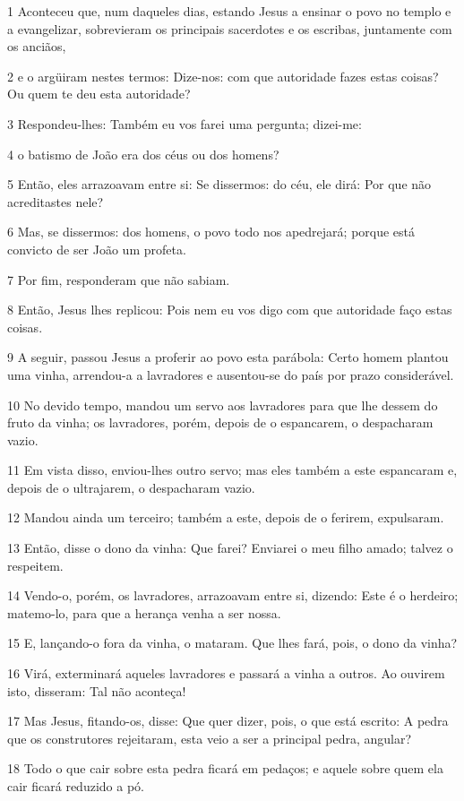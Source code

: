 \par 1 Aconteceu que, num daqueles dias, estando Jesus a ensinar o povo no templo e a evangelizar, sobrevieram os principais sacerdotes e os escribas, juntamente com os anciãos,
\par 2 e o argüiram nestes termos: Dize-nos: com que autoridade fazes estas coisas? Ou quem te deu esta autoridade?
\par 3 Respondeu-lhes: Também eu vos farei uma pergunta; dizei-me:
\par 4 o batismo de João era dos céus ou dos homens?
\par 5 Então, eles arrazoavam entre si: Se dissermos: do céu, ele dirá: Por que não acreditastes nele?
\par 6 Mas, se dissermos: dos homens, o povo todo nos apedrejará; porque está convicto de ser João um profeta.
\par 7 Por fim, responderam que não sabiam.
\par 8 Então, Jesus lhes replicou: Pois nem eu vos digo com que autoridade faço estas coisas.
\par 9 A seguir, passou Jesus a proferir ao povo esta parábola: Certo homem plantou uma vinha, arrendou-a a lavradores e ausentou-se do país por prazo considerável.
\par 10 No devido tempo, mandou um servo aos lavradores para que lhe dessem do fruto da vinha; os lavradores, porém, depois de o espancarem, o despacharam vazio.
\par 11 Em vista disso, enviou-lhes outro servo; mas eles também a este espancaram e, depois de o ultrajarem, o despacharam vazio.
\par 12 Mandou ainda um terceiro; também a este, depois de o ferirem, expulsaram.
\par 13 Então, disse o dono da vinha: Que farei? Enviarei o meu filho amado; talvez o respeitem.
\par 14 Vendo-o, porém, os lavradores, arrazoavam entre si, dizendo: Este é o herdeiro; matemo-lo, para que a herança venha a ser nossa.
\par 15 E, lançando-o fora da vinha, o mataram. Que lhes fará, pois, o dono da vinha?
\par 16 Virá, exterminará aqueles lavradores e passará a vinha a outros. Ao ouvirem isto, disseram: Tal não aconteça!
\par 17 Mas Jesus, fitando-os, disse: Que quer dizer, pois, o que está escrito: A pedra que os construtores rejeitaram, esta veio a ser a principal pedra, angular?
\par 18 Todo o que cair sobre esta pedra ficará em pedaços; e aquele sobre quem ela cair ficará reduzido a pó.
